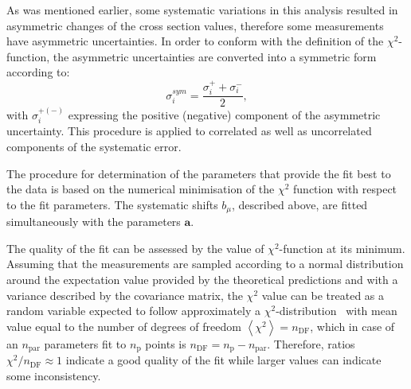 As was mentioned earlier, some systematic variations in this analysis resulted in asymmetric changes of the cross section values, therefore some measurements have asymmetric uncertainties. In order to conform with the definition of the $\chi^2$-function, the asymmetric uncertainties are converted into a symmetric form according to:
\begin{equation}
 \sigma_i^{sym} = \frac{\sigma_i^+ + \sigma_i^-}{2},
\end{equation}
with $\sigma_i^{+\left(-\right)}$ expressing the positive (negative) component of the asymmetric uncertainty. This procedure is applied to correlated as well as uncorrelated components of the systematic error.

The procedure for determination of the parameters that provide the fit best to the data is based on the numerical minimisation of the $\chi^2$ function with respect to the fit parameters. The systematic shifts $b_\mu$, described above, are fitted simultaneously with the parameters $\mathbf{a}$.

The quality of the fit can be assessed by the value of $\chi^2$-function at its minimum. Assuming that the measurements are sampled according to a normal distribution around the expectation value provided by the theoretical predictions and with a variance described by the covariance matrix, the $\chi^2$ value can be treated as a random variable expected to follow approximately a $\chi^2$-distri\-bu\-tion~\cite{PDG:2014}
with mean value equal to the number of degrees of freedom $\left\langle \chi^2 \right\rangle = n_\text{DF}$, which in case of an $n_\text{par}$ parameters fit to $n_\text{p}$ points is $n_\text{DF}=n_\text{p}-n_\text{par}$.
Therefore, ratios $\chi^2/n_\text{DF} \approx 1$ indicate a good quality of the fit while larger values can indicate some inconsistency.
